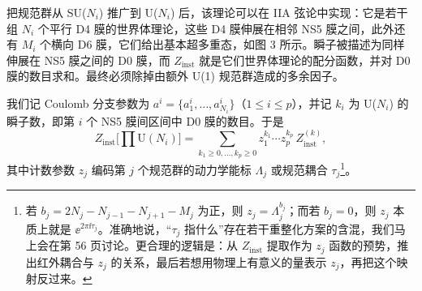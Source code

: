 把规范群从 SU($N_i$) 推广到 U($N_i$) 后，该理论可以在 IIA 弦论中实现：它是若干组 $N_i$ 个平行 D4 膜的世界体理论，这些 D4 膜伸展在相邻 NS5 膜之间，此外还有 $M_i$ 个横向 D6 膜，它们给出基本超多重态，如图 3 所示。瞬子被描述为同样伸展在 NS5 膜之间的 D0 膜，而 $Z_{\mathrm{inst}}$ 就是它们世界体理论的配分函数，并对 D0 膜的数目求和。最终必须除掉由额外 U(1) 规范群造成的多余因子。


我们记 Coulomb 分支参数为 $a^i=\{a^i_1,\dots,a^i_{N_i}\}$（$1\le i\le p$），并记 $k_i$ 为 U($N_i$) 的瞬子数，即第 $i$ 个 NS5 膜间区间中 D0 膜的数目。于是
\begin{equation}
  Z_{\mathrm{inst}}\Big[\prod \mathrm{U}(N_i)\Big] = \sum_{k_1\ge0,\dots,k_p\ge0} z_1^{k_1}\cdots z_p^{k_p}\, Z^{(k)}_{\mathrm{inst}},
  \tag{5.32}
\end{equation}
其中计数参数 $z_j$ 编码第 $j$ 个规范群的动力学能标 $\Lambda_j$ 或规范耦合 $\tau_j$\footnote{若 $b_j=2N_j-N_{j-1}-N_{j+1}-M_j$ 为正，则 $z_j=\Lambda_j^{b_j}$；而若 $b_j=0$，则 $z_j$ 本质上就是 $\ee^{2\pi\ii\tau_j}$。准确地说，“$\tau_j$ 指什么”存在若干重整化方案的含混，我们马上会在第 56 页讨论。更合理的逻辑是：从 $Z_{\mathrm{inst}}$ 提取作为 $z_j$ 函数的预势，推出红外耦合与 $z_j$ 的关系，最后若想用物理上有意义的量表示 $z_j$，再把这个映射反过来。}。

